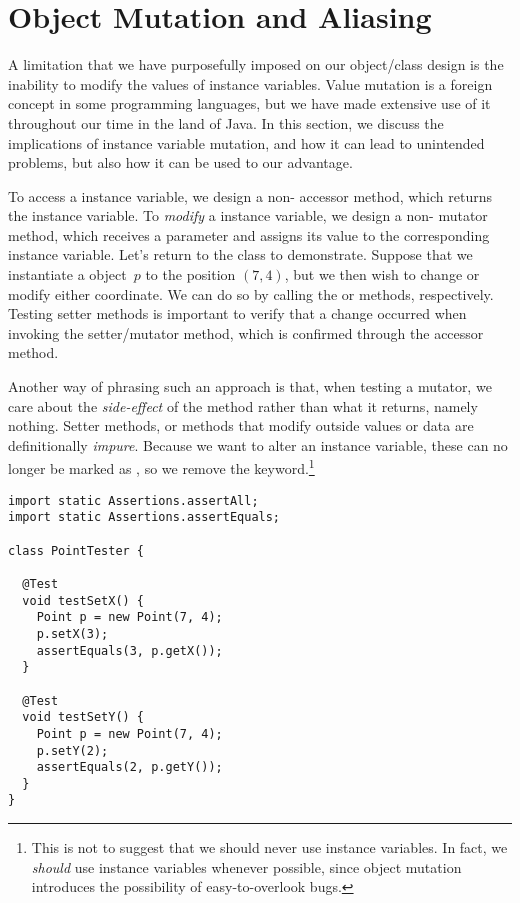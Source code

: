 \section{Object Mutation and Aliasing}
\label{chapter-classes-mutation-aliasing}

A limitation that we have purposefully imposed on our object/class design is the inability to modify the values of instance variables. 
Value mutation is a foreign concept in some programming languages, but we have made extensive use of it throughout our time in the land of Java. 
In this section, we discuss the implications of instance variable mutation, and how it can lead to unintended problems, but also how it can be used to our advantage.

To access a  instance variable, we design a non- accessor method, which returns the instance variable. 
To \emph{modify} a  instance variable, we design a non- mutator method, which receives a parameter and assigns its value to the corresponding instance variable. 
Let's return to the  class to demonstrate. 
Suppose that we instantiate a  object~$p$ to the position $(7, 4)$, but we then wish to change or modify either coordinate. 
We can do so by calling the  or  methods, respectively. 
Testing setter methods is important to verify that a change occurred when invoking the setter/mutator method, which is confirmed through the accessor method. 

Another way of phrasing such an approach is that, when testing a mutator, we care about the \emph{side-effect} of the method rather than what it returns, namely nothing. 
Setter methods, or methods that modify outside values or data are definitionally \emph{impure}. 
Because we want to alter an instance variable, these can no longer be marked as , so we remove the keyword.\footnote{This is not to suggest that we should never use  instance variables. In fact, we \emph{should} use  instance variables whenever possible, since object mutation introduces the possibility of easy-to-overlook bugs.}

\begin{lstlisting}[language=MyJava]
import static Assertions.assertAll;
import static Assertions.assertEquals;

class PointTester {

  @Test
  void testSetX() {
    Point p = new Point(7, 4);
    p.setX(3);
    assertEquals(3, p.getX());
  }

  @Test
  void testSetY() {
    Point p = new Point(7, 4);
    p.setY(2);
    assertEquals(2, p.getY());
  }
}
\end{lstlisting}

